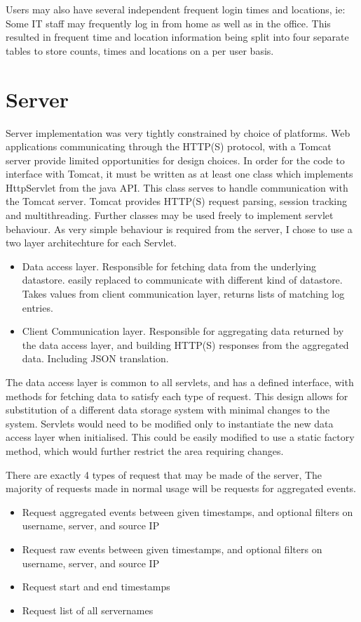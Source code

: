 Users may also have several independent frequent login times and locations, ie: Some IT staff may frequently log in from home as well as in the office. This resulted in frequent time and location information being split into four separate tables to store counts, times and locations on a per user basis.

\section{Server}
Server implementation was very tightly constrained by choice of platforms. Web applications communicating through the HTTP(S) protocol, with a Tomcat server provide limited opportunities for design choices.
In order for the code to interface with Tomcat, it must be written as at least one class which implements HttpServlet from the java API. 
This class serves to handle communication with the Tomcat server. Tomcat provides HTTP(S) request parsing, session tracking and multithreading. Further classes may be used freely to implement servlet behaviour. As very simple behaviour is required from the server, I chose to use a two layer architechture for each Servlet. 
\begin{itemize}
\item{Data access layer. Responsible for fetching data from the underlying datastore. easily replaced to communicate with different kind of datastore. Takes values from client communication layer, returns lists of matching log entries.}
\item{Client Communication layer. Responsible for aggregating data returned by the data access layer, and building HTTP(S) responses from the aggregated data. Including JSON translation.}
\end{itemize}
The data access layer is common to all servlets, and has a defined interface, with methods for fetching data to satisfy each type of request. This design allows for substitution of a different data storage system with minimal changes to the system. Servlets would need to be modified only to instantiate the new data access layer when initialised. This could be easily modified to use a static factory method, which would further restrict the area requiring changes.

There are exactly 4 types of request that may be made of the server, The majority of requests made in normal usage will be requests for aggregated events. 
\begin{itemize}
\item{Request aggregated events between given timestamps, and optional filters on username, server, and source IP}
\item{Request raw events between given timestamps, and optional filters on username, server, and source IP}
\item{Request start and end timestamps}
\item{Request list of all servernames}
\end{itemize}

